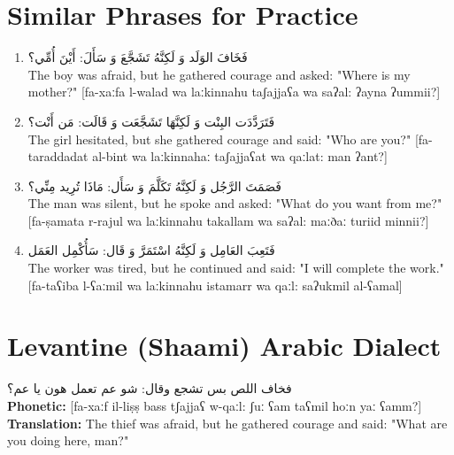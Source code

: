 \documentclass[a4paper,12pt]{article}
\begin{document}
\section{Similar Phrases for Practice}

\begin{enumerate}
\item \textarabic{فَخَافَ الوَلَد وَ لَكِنَّهُ تَشَجَّعَ وَ سَأَلَ: أَيْنَ أُمِّي؟}\\
The boy was afraid, but he gathered courage and asked: "Where is my mother?" [fa-xaːfa l-walad wa laːkinnahu taʃajjaʕa wa saʔal: ʔayna ʔummii?]

\item \textarabic{فَتَرَدَّدَت البِنْت وَ لَكِنَّهَا تَشَجَّعَت وَ قَالَت: مَن أَنْت؟}\\
The girl hesitated, but she gathered courage and said: "Who are you?" [fa-taraddadat al-bint wa laːkinnahaː taʃajjaʕat wa qaːlat: man ʔant?]

\item \textarabic{فَصَمَتَ الرَّجُل وَ لَكِنَّهُ تَكَلَّمَ وَ سَأَل: مَاذَا تُرِيد مِنِّي؟}\\
The man was silent, but he spoke and asked: "What do you want from me?" [fa-ṣamata r-rajul wa laːkinnahu takallam wa saʔal: maːðaː turiid minnii?]

\item \textarabic{فَتَعِبَ العَامِل وَ لَكِنَّهُ اسْتَمَرَّ وَ قَال: سَأُكْمِل العَمَل}\\
The worker was tired, but he continued and said: "I will complete the work." [fa-taʕiba l-ʕaːmil wa laːkinnahu istamarr wa qaːl: saʔukmil al-ʕamal]
\end{enumerate}

\section{Levantine (Shaami) Arabic Dialect}

\begin{tcolorbox}[colback=white,colframe=dialectcolor,title=\textbf{Levantine Version}]
\textarabic{فخاف اللص بس تشجع وقال: شو عم تعمل هون يا عم؟}\\
\textbf{Phonetic:} [fa-xaːf il-liṣṣ bass tʃajjaʕ w-qaːl: ʃuː ʕam taʕmil hoːn yaː ʕamm?]\\
\textbf{Translation:} The thief was afraid, but he gathered courage and said: "What are you doing here, man?"
\end{tcolorbox}
\end{document}
